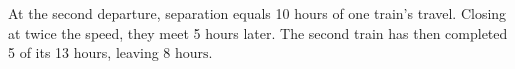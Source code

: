 At the second departure, separation equals 10 hours of one train's travel. Closing at twice the speed, they meet 5 hours later. The second train has then completed 5 of its 13 hours, leaving $\boxed8\text{ hours}$.
